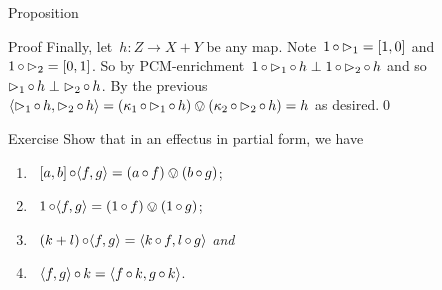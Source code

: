 \documentclass[b]{subfiles}
\begin{document}
\begin{parsec}
\begin{point}{Proposition}
\begin{point}{Proof}
Finally, let~$h\colon Z\to X+Y$ be any map.
Note~$1 \mathop{\circ} \mathord{\vartriangleright}_1 = [1,0]$
    and~$1 \mathop{\circ} \mathord{\vartriangleright}_2 = [0,1]$.
So by PCM-enrichment~$1 \mathop{\circ} \mathord{\vartriangleright}_1 \mathop{\circ} h \perp 1 \mathop{\circ} \mathord{\vartriangleright}_2 \mathop{\circ} h$ and so~$\mathord{\vartriangleright}_1 \mathop{\circ} h \perp \mathord{\vartriangleright}_2 \mathop{\circ} h$.
By the previous
$\langle \mathord{\vartriangleright}_1 \mathop{\circ} h, \mathord{\vartriangleright}_2 \mathop{\circ} h\rangle
= (\kappa_1 \mathop{\circ} \mathord{\vartriangleright}_1 \mathop{\circ} h) \ovee
 (\kappa_2 \mathop{\circ} \mathord{\vartriangleright}_2 \mathop{\circ} h) 
 = h $ as desired.\qed
\end{point}
\end{point}

\begin{point}{Exercise}%
Show that in an effectus in partial form, we have
\begin{enumerate}
    \item~$[a,b] \mathop{\circ} \langle f, g \rangle = (a \mathop{\circ} f) \ovee (b \mathop{\circ} g)$;
    \item~$1 \mathop{\circ} \langle f, g\rangle = (1 \mathop{\circ} f) \ovee(1 \mathop{\circ} g)$;
    \item~$(k+l) \mathop{\circ} \langle f, g\rangle
        = \langle k \mathop{\circ} f, l \mathop{\circ} g \rangle$ \emph{and}
    \item~$\langle f, g\rangle \mathop{\circ} k = \langle f \mathop{\circ} k,
                                g \mathop{\circ} k \rangle$.
\end{enumerate}
\end{point}


\end{parsec}
\end{document}
